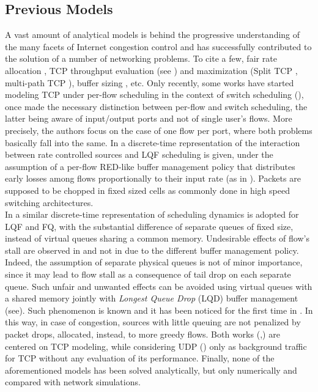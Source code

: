 \documentclass[a4paper,oneside, 11pt]{article}
\begin{document}
\subsection{Previous Models}
A vast amount of analytical models is behind the progressive understanding of the many facets of Internet congestion control
and has successfully contributed to the solution of
a number of networking problems. To cite a few, fair rate allocation \cite{Kelly98, massoulie}, TCP throughput evaluation
(see \cite{padhye,misra,altman,baccelli,ajmone}) and maximization (Split TCP \cite{carofiglioSplit}, multi-path TCP \cite{multipathTCP}),
buffer sizing \cite{Wischik}, etc.
Only recently, some works have started modeling
TCP under per-flow scheduling in the context of switch scheduling (\hspace{-0.2mm}\cite{giaccone, keslassyTCP}),
once made the necessary distinction between per-flow and switch scheduling, the latter being aware of input/output ports and not
of single user's flows.
More precisely, the authors focus on the case of one flow per port, where both problems basically fall into the same.
In \cite{giaccone} a discrete-time representation of the interaction between
rate controlled sources and LQF scheduling is given,
under the assumption of a per-flow RED-like buffer management policy that distributes early losses
among flows proportionally to their input rate (as in \cite{fred, afd}).
Packets are supposed to be chopped in fixed sized cells as commonly done
in high speed switching architectures.
\\In \cite{keslassyTCP} a similar discrete-time representation of scheduling dynamics is adopted for LQF and FQ,
with the substantial difference of separate queues of fixed size, instead of
virtual queues sharing a common memory.
Undesirable effects of flow's stall are observed in \cite{keslassyTCP}
and not in \cite{giaccone} due to the different buffer management policy.
Indeed, the assumption of separate physical queues is not of minor importance, since it may lead to flow  stall
as a consequence of tail drop on each separate queue.
Such unfair and unwanted effects
can be avoided using virtual queues with a shared memory jointly with \textit{Longest Queue Drop} (LQD)  buffer management
(see\cite{suter}).
Such phenomenon is known and it has been noticed for the first time in \cite{suter}.
In this way, in case of congestion, sources with little queuing are not penalized by packet drops,
allocated, instead, to more greedy flows.
Both works (\hspace{-0.1mm}\cite{giaccone},\cite{keslassyTCP}) are centered on TCP modeling, while considering UDP
(\hspace{-0.1mm}\cite{keslassyTCP}) only
as background traffic for TCP without any evaluation of its performance.
Finally, none of the aforementioned models has been solved analytically,
but only numerically and compared with network simulations.
\end{document}
